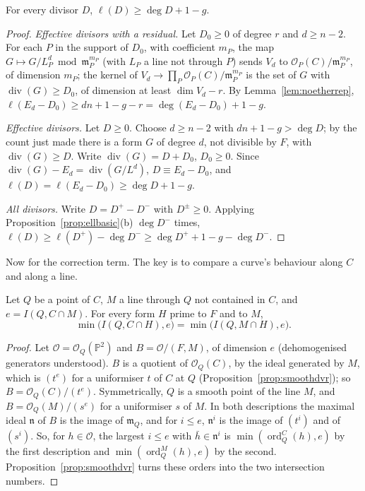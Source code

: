 \begin{proposition}\label{prop:riemann}
For every divisor $D$, $\ell(D)\ge\deg D+1-g$.
\end{proposition}
\begin{proof}
\emph{Effective divisors with a residual.} Let $D_0\ge0$ of degree $r$ and $d\ge n-2$. For each $P$ in the support of $D_0$, with coefficient $m_P$, the map
$G\mapsto G/L_P^d\bmod\mathfrak m_P^{m_P}$ (with $L_P$ a line not through $P$) sends $V_d$ to $\mathcal O_P(C)/\mathfrak m_P^{m_P}$, of dimension $m_P$; the
kernel of $V_d\to\prod_P\mathcal O_P(C)/\mathfrak m_P^{m_P}$ is the set of $G$ with $\operatorname{div}(G)\ge D_0$, of dimension at least
$\dim V_d-r$. By Lemma~\ref{lem:noetherrep}, $\ell(E_d-D_0)\ge dn+1-g-r=\deg(E_d-D_0)+1-g$.

\emph{Effective divisors.} Let $D\ge0$. Choose $d\ge n-2$ with $dn+1-g>\deg D$; by the count just made there is a form $G$ of degree $d$, not divisible by $F$,
with $\operatorname{div}(G)\ge D$. Write $\operatorname{div}(G)=D+D_0$, $D_0\ge0$. Since $\operatorname{div}(G)-E_d=\operatorname{div}(G/L^d)$, $D\equiv E_d-D_0$, and
$\ell(D)=\ell(E_d-D_0)\ge\deg D+1-g$.

\emph{All divisors.} Write $D=D^+-D^-$ with $D^\pm\ge0$. Applying Proposition~\ref{prop:ellbasic}(b) $\deg D^-$ times,
$\ell(D)\ge\ell(D^+)-\deg D^-\ge\deg D^++1-g-\deg D^-$.
\end{proof}

Now for the correction term. The key is to compare a curve's behaviour along $C$ and along a line.

\begin{lemma}\label{lem:truncate}
Let $Q$ be a point of $C$, $M$ a line through $Q$ not contained in $C$, and $e=I(Q,C\cap M)$. For every form $H$ prime to $F$ and to $M$,
\[
\min\bigl(I(Q,C\cap H),e\bigr)=\min\bigl(I(Q,M\cap H),e\bigr).
\]
\end{lemma}
\begin{proof}
Let $\mathcal O=\mathcal O_Q(\mathbb P^2)$ and $B=\mathcal O/(F,M)$, of dimension $e$ (dehomogenised generators understood). $B$ is a quotient of
$\mathcal O_Q(C)$, by the ideal generated by $M$, which is $(t^e)$ for a uniformiser $t$ of $C$ at $Q$ (Proposition~\ref{prop:smoothdvr}); so
$B=\mathcal O_Q(C)/(t^e)$. Symmetrically, $Q$ is a smooth point of the line $M$, and $B=\mathcal O_Q(M)/(s^e)$ for a uniformiser $s$ of $M$. In both
descriptions the maximal ideal $\mathfrak n$ of $B$ is the image of $\mathfrak m_Q$, and for $i\le e$, $\mathfrak n^i$ is the image of $(t^i)$ and of
$(s^i)$. So, for $h\in\mathcal O$, the largest $i\le e$ with $\bar h\in\mathfrak n^i$ is $\min(\operatorname{ord}^C_Q(h),e)$ by the first description and
$\min(\operatorname{ord}^M_Q(h),e)$ by the second. Proposition~\ref{prop:smoothdvr} turns these orders into the two intersection numbers.
\end{proof}

